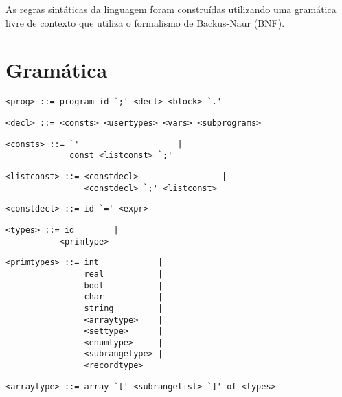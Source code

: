 As regras sintáticas da linguagem foram construídas utilizando uma gramática livre de contexto que utiliza o formalismo de Backus-Naur (BNF).


\section{Gramática}

\begin{footnotesize}
\begin{lstlisting}[frame=single, label={prog}, language=pie]
<prog> ::= program id `;' <decl> <block> `.'
\end{lstlisting}

\begin{lstlisting}[frame=single, label={decl}, language=pie]
<decl> ::= <consts> <usertypes> <vars> <subprograms>
\end{lstlisting}

\begin{lstlisting}[frame=single, label={consts}, language=pie]
<consts> ::= `'                    | 
             const <listconst> `;'
\end{lstlisting}

\begin{lstlisting}[frame=single, label={listconst}, language=pie]
<listconst> ::= <constdecl>                 |
                <constdecl> `;' <listconst>
\end{lstlisting}

\begin{lstlisting}[frame=single, label={constdecl}, language=pie]
<constdecl> ::= id `=' <expr>
\end{lstlisting}

\begin{lstlisting}[frame=single, label={types}, language=pie]
<types> ::= id        |
           <primtype>
\end{lstlisting}

\begin{lstlisting}[frame=single, label={primtypes}, language=pie]
<primtypes> ::= int            |
                real           | 
                bool           |
                char           |
                string         |
                <arraytype>    |
                <settype>      |
                <enumtype>     |
                <subrangetype> |
                <recordtype>
\end{lstlisting}

\begin{lstlisting}[frame=single, label={arraytype}, language=pie]
<arraytype> ::= array `[' <subrangelist> `]' of <types>
\end{lstlisting}


\end{footnotesize}
